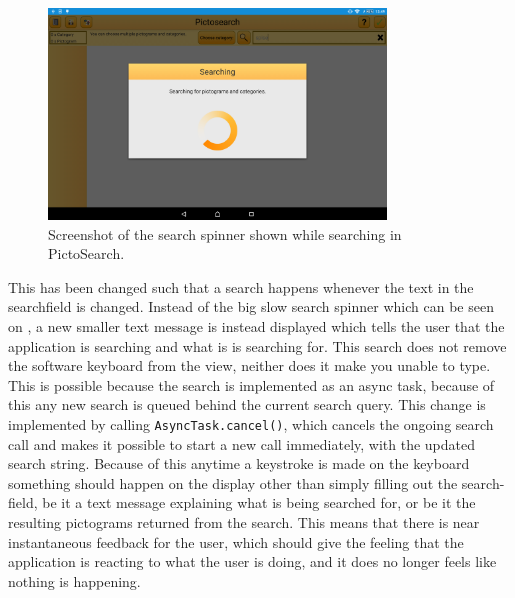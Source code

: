 \begin{figure}[h]
    \centering
    \includegraphics[width=0.8\textwidth]{figures/img/screenshots/old_dialog.png}
    \caption{Screenshot of the search spinner shown while searching in PictoSearch.}\label{fig:screenshot_searchspinner}
\end{figure}
This has been changed such that a search happens whenever the text in the searchfield is changed.
Instead of the big slow search spinner which can be seen on , a new smaller text message is instead displayed which tells the user that the application is searching and what is is searching for. 
This search does not remove the software keyboard from the view, neither does it make you unable to type.
This is possible because the search is implemented as an async task, because of this any new search is queued behind the current search query.
This change is implemented by calling \texttt{AsyncTask.cancel()}, which cancels the ongoing search call and makes it possible to start a new call immediately, with the updated search string.
Because of this anytime a keystroke is made on the keyboard something should happen on the display other than simply filling out the search-field, be it a text message explaining what is being searched for, or be it the resulting pictograms returned from the search.
This means that there is near instantaneous feedback for the user, which should give the feeling that the application is reacting to what the user is doing, and it does no longer feels like nothing is happening.

